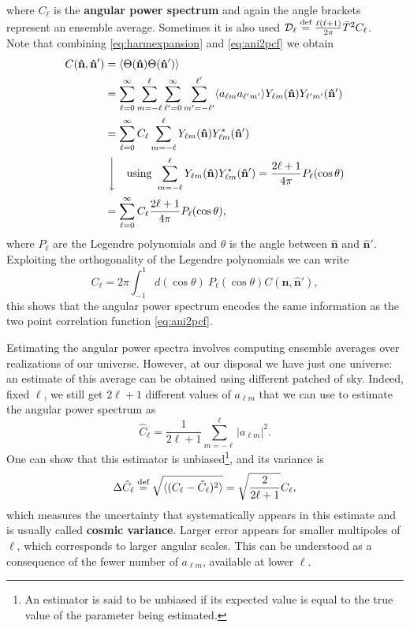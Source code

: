 where $C_{\ell}$ is the \textbf{angular power spectrum} and again the angle brackets represent an ensemble average. Sometimes it is also used $\mathcal{D}_\ell \stackrel{\text{def}}{=} \frac{\ell(\ell+1)}{2\pi}\bar{T}^2C_{\ell}$.\\
Note that combining \eqref{eq:harmexpansion} and \eqref{eq:ani2pcf} we obtain
\begin{align*}
    C(\mathbf{\hat{n}},\mathbf{\hat{n}}') &= \langle \Theta(\mathbf{\hat{n}})\Theta(\mathbf{\hat{n}}') \rangle \\ &= \sum_{\ell=0}^{\infty} \sum_{m=-\ell}^{\ell}  \sum_{\ell'=0}^{\infty} \sum_{m'=-\ell'}^{\ell'} \langle a_{\ell m} a_{\ell' m'} \rangle Y_{\ell m}(\mathbf{\hat{n}})Y_{\ell' m'}(\mathbf{\hat{n}}')\\
    &= \sum_{\ell=0}^{\infty}C_{\ell} \sum_{m=-\ell}^{\ell}  Y_{\ell m}(\mathbf{\hat{n}})Y^*_{\ell m}(\mathbf{\hat{n}}')\\
    &\ \Bigg\downarrow\quad \text{using } \sum_{m=-\ell}^{\ell}Y_{\ell m}(\mathbf{\hat{n}})Y^*_{\ell m}(\mathbf{\hat{n}}')=\frac{2\ell+1}{4\pi}P_{\ell}(\cos\theta)\\
    &=\sum_{\ell=0}^{\infty} C_{\ell}\frac{2\ell+1}{4\pi}P_{\ell}(\cos\theta),
    \end{align*}
where $P_{\ell}$ are the Legendre polynomials and $\theta$ is the angle between $\mathbf{\hat{n}}$ and $\mathbf{\hat{n}}'$.
Exploiting the orthogonality of the Legendre polynomials we can write
\begin{equation}\label{eq:cl}
    C_{\ell} = 2\pi\int_{-1}^{1}d(\cos\theta)\ P_{\ell}(\cos\theta)C(\mathbf{\hat{n}},\mathbf{\hat{n}}'),
\end{equation}
this shows that the angular power spectrum encodes the same information as the two point correlation function \eqref{eq:ani2pcf}. 

Estimating the angular power spectra involves computing ensemble averages over realizations of our universe. However, at our disposal we have just one universe: an estimate of this average can be obtained using different patched of sky. Indeed, fixed $\ell$, we still get $2\ell+1$ different values of $a_{\ell  m}$ that we can use to estimate the angular power spectrum as
\begin{equation}\label{eq:cl_estimate}
    \hat{C}_{\ell} = \frac{1}{2\ell+1}\sum_{m=-\ell}^{\ell} |a_{\ell m}|^2.
\end{equation}
One can show that this estimator is unbiased\footnote{An estimator is said to be unbiased if its expected value is equal to the true value of the parameter being estimated.}, and its variance is
\begin{equation}\label{eq:cl_variance}
    \Delta\hat{C}_{\ell} \stackrel{\text{def}}{=}\sqrt{\langle(C_\ell -\hat C_\ell)^2\rangle} = \sqrt{\frac{2}{2\ell+1}}C_{\ell},
\end{equation} 
which measures the uncertainty that systematically appears in this estimate and is usually called \textbf{cosmic variance}. Larger error appears for smaller multipoles of $\ell$, which corresponds to larger angular scales. This can be understood as a consequence of the fewer number of $a_{\ell m}$, available at lower $\ell$. 

